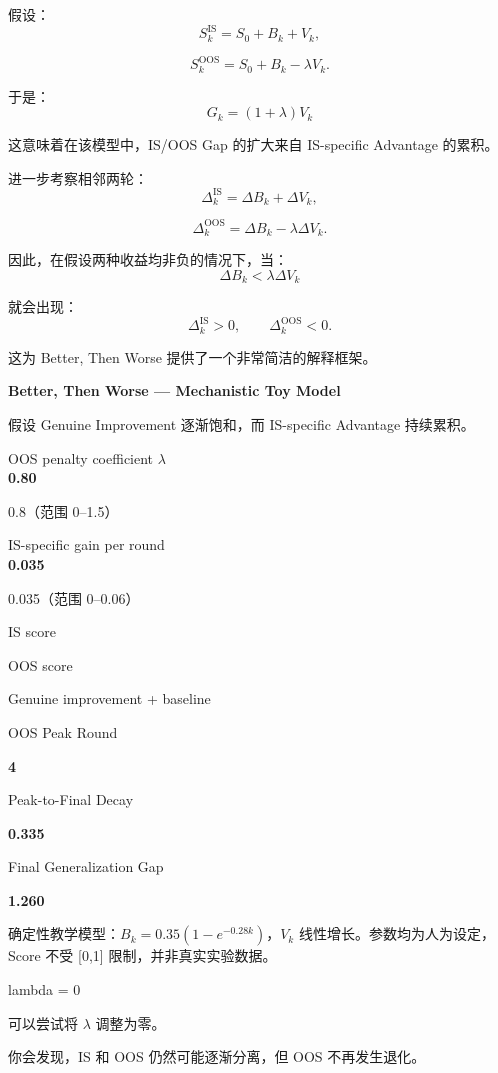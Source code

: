 假设：
\[S_k^{\mathrm{IS}}
=
S_0+B_k+V_k,\]

\[S_k^{\mathrm{OOS}}
=
S_0+B_k-\lambda V_k.\]

于是：
\[\boxed{
G_k=(1+\lambda)V_k
}\]

这意味着在该模型中，IS/OOS Gap 的扩大来自 IS-specific Advantage 的累积。

进一步考察相邻两轮：
\[\Delta_k^{\mathrm{IS}}
=
\Delta B_k+\Delta V_k,\]

\[\Delta_k^{\mathrm{OOS}}
=
\Delta B_k-\lambda\Delta V_k.\]

因此，在假设两种收益均非负的情况下，当：
\[\boxed{
\Delta B_k<\lambda\Delta V_k
}\]

就会出现：
\[\Delta_k^{\mathrm{IS}}>0,
\qquad
\Delta_k^{\mathrm{OOS}}<0.\]

这为 Better, Then Worse 提供了一个非常简洁的解释框架。

\textbf{Better, Then Worse --- Mechanistic Toy Model}

假设 Genuine Improvement 逐渐饱和，而 IS-specific Advantage 持续累积。

OOS penalty coefficient \(\lambda\)\\
\textbf{0.80}

0.8（范围 0--1.5）

IS-specific gain per round\\
\textbf{0.035}

0.035（范围 0--0.06）


IS score

OOS score

Genuine improvement + baseline

OOS Peak Round

\textbf{4}

Peak-to-Final Decay

\textbf{0.335}

Final Generalization Gap

\textbf{1.260}

确定性教学模型：\(B_k=0.35(1-e^{-0.28k})\)，\(V_k\) 线性增长。参数均为人为设定，Score 不受 {[}0,1{]} 限制，并非真实实验数据。

lambda = 0


可以尝试将 \(\lambda\) 调整为零。

你会发现，IS 和 OOS 仍然可能逐渐分离，但 OOS 不再发生退化。

